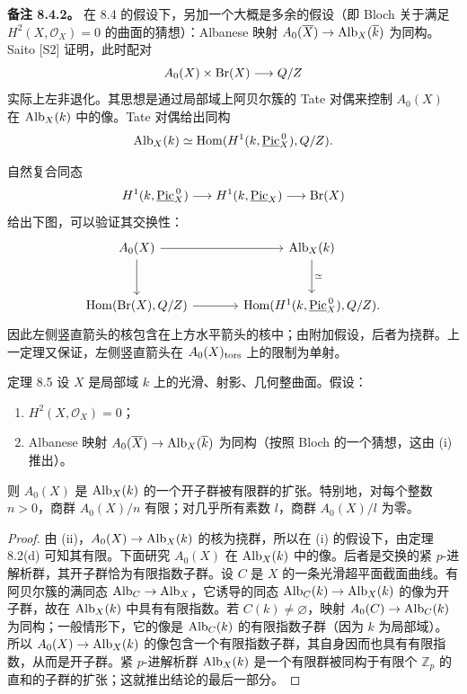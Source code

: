 \noindent\textbf{备注 8.4.2。} 在 8.4 的假设下，另加一个大概是多余的假设（即 Bloch 关于满足 $H^2(X,\mathcal O_X)=0$ 的曲面的猜想）：Albanese 映射 $A_0(\overline X)\to\operatorname{Alb}_X(\overline k)$ 为同构。Saito [S2] 证明，此时配对
\[
 A_0(X)\times\operatorname{Br}(X)\longrightarrow Q/Z
\]
实际上左非退化。其思想是通过局部域上阿贝尔簇的 Tate 对偶来控制 $A_0(X)$ 在 $\operatorname{Alb}_X(k)$ 中的像。Tate 对偶给出同构
\[
 \operatorname{Alb}_X(k)\simeq\operatorname{Hom}(H^1(k,\underline{\operatorname{Pic}}^{\,0}_X),Q/Z).
\]

自然复合同态
\[
 H^1(k,\underline{\operatorname{Pic}}^{\,0}_X)
 \longrightarrow H^1(k,\underline{\operatorname{Pic}}_X)\longrightarrow\operatorname{Br}(X)
\]
给出下图，可以验证其交换性：
\[
\begin{tikzcd}[ampersand replacement=\&,column sep=large,row sep=large]
 A_0(X)\arrow[r]\arrow[d]\&\Alb_X(k)\arrow[d,"{\simeq}"]\\
 \Hom(\Br(X),\mathbb Q/\mathbb Z)\arrow[r]
 \&\Hom(H^1(k,\underline{\Pic}^{\,0}_X),\mathbb Q/\mathbb Z).
\end{tikzcd}
\]
因此左侧竖直箭头的核包含在上方水平箭头的核中；由附加假设，后者为挠群。上一定理又保证，左侧竖直箭头在 $A_0(X)_{\mathrm{tors}}$ 上的限制为单射。

\begin{statement}{定理 8.5}
设 $X$ 是局部域 $k$ 上的光滑、射影、几何整曲面。假设：
\begin{enumerate}[label=(\roman*)]
\item $H^2(X,\mathcal O_X)=0$；
\item Albanese 映射 $A_0(\overline X)\to\operatorname{Alb}_X(\overline k)$ 为同构（按照 Bloch 的一个猜想，这由 (i) 推出）。
\end{enumerate}
则 $A_0(X)$ 是 $\operatorname{Alb}_X(k)$ 的一个开子群被有限群的扩张。特别地，对每个整数 $n>0$，商群 $A_0(X)/n$ 有限；对几乎所有素数 $l$，商群 $A_0(X)/l$ 为零。
\end{statement}
\begin{proof}
由 (ii)，$A_0(X)\to\operatorname{Alb}_X(k)$ 的核为挠群，所以在 (i) 的假设下，由定理 8.2(d) 可知其有限。下面研究 $A_0(X)$ 在 $\operatorname{Alb}_X(k)$ 中的像。后者是交换的紧 $p$-进解析群，其开子群恰为有限指数子群。设 $C$ 是 $X$ 的一条光滑超平面截面曲线。有阿贝尔簇的满同态 $\operatorname{Alb}_C\to\operatorname{Alb}_X$，它诱导的同态 $\operatorname{Alb}_C(k)\to\operatorname{Alb}_X(k)$ 的像为开子群，故在 $\operatorname{Alb}_X(k)$ 中具有有限指数。若 $C(k)\ne\varnothing$，映射 $A_0(C)\to\operatorname{Alb}_C(k)$ 为同构；一般情形下，它的像是 $\operatorname{Alb}_C(k)$ 的有限指数子群（因为 $k$ 为局部域）。所以 $A_0(X)\to\operatorname{Alb}_X(k)$ 的像包含一个有限指数子群，其自身因而也具有有限指数，从而是开子群。紧 $p$-进解析群 $\operatorname{Alb}_X(k)$ 是一个有限群被同构于有限个 $\mathbb Z_p$ 的直和的子群的扩张；这就推出结论的最后一部分。
\end{proof}

